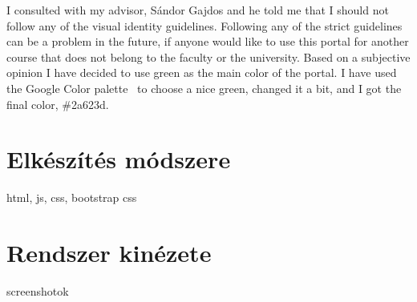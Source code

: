 I consulted with my advisor, Sándor Gajdos and he told me that I should not follow any of the visual identity guidelines. Following any of the strict guidelines can be a problem in the future, if anyone would like to use this portal for another course that does not belong to the faculty or the university. Based on a subjective opinion I have decided to use green as the main color of the portal. I have used the Google Color palette~\cite{google-color-chart} to choose a nice green, changed it a bit, and I got the final color, \#2a623d.

\section{Elkészítés módszere}

html, js, css, bootstrap css


\section{Rendszer kinézete}

screenshotok

